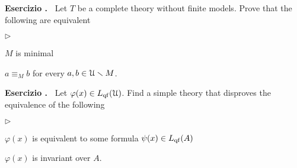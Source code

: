 \documentclass[10pt]{article}
\def\phi{\varphi}
\def\U{\EuScript U}
\def\sm{\smallsetminus}
\newcommand{\labella}[1]{{\sf\footnotesize #1}\hfill}
\renewenvironment{itemize}
  {\begin{list}{$\triangleright$}{%
   \setlength{\parskip}{0mm}
   \setlength{\topsep}{0mm}
   \setlength{\rightmargin}{0mm}
   \setlength{\listparindent}{0mm}
   \setlength{\itemindent}{0mm}
   \setlength{\labelwidth}{3ex}
   \setlength{\itemsep}{0mm}
   \setlength{\parsep}{0mm}
   \setlength{\partopsep}{0mm}
   \setlength{\labelsep}{1ex}
   \setlength{\leftmargin}{\labelwidth+\labelsep}
   \let\makelabel\labella}}{%
  \end{list}}
\newcounter{ex}
\newenvironment{exercise}{\medskip\addtocounter{ex}{1}\textbf{Esercizio \theex.\ }}{}
\begin{document}
\begin{exercise}
  Let $T$ be a complete theory without finite models.
  Prove that the following are equivalent
  \begin{itemize}
  \item[1.] $M$ is minimal
  \item[2.] $a\equiv_M b$ for every $a, b\in \U\sm M$.
  \end{itemize}
\end{exercise}
  
\begin{exercise}
  Let $\phi(x)\in L_{\rm qf}(\U)$.
  Find a simple theory that disproves the equivalence of the following
  \begin{itemize}
   \item[1.] $\phi(x)$ is equivalent to some formula $\psi(x)\in L_{\rm qf}(A)$
   \item[2.] $\phi(x)$ is invariant over $A$.
  \end{itemize}
\end{exercise}

\vfill
\end{document}
